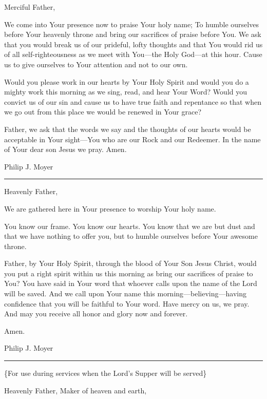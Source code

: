 \documentclass[]{book}
\begin{document}
Merciful Father,

We come into Your presence now to praise Your holy name; To humble
ourselves before Your heavenly throne and bring our sacrifices of praise
before You. We ask that you would break us of our prideful, lofty
thoughts and that You would rid us of all self-righteousness as we meet
with You---the Holy God---at this hour. Cause us to give ourselves to
Your attention and not to our own.

Would you please work in our hearts by Your Holy Spirit and would you do
a mighty work this morning as we sing, read, and hear Your Word? Would
you convict us of our sin and cause us to have true faith and repentance
so that when we go out from this place we would be renewed in Your
grace?

Father, we ask that the words we say and the thoughts of our hearts
would be acceptable in Your sight---You who are our Rock and our
Redeemer. In the name of Your dear son Jesus we pray. Amen.

Philip J. Moyer

\begin{center}\rule{0.5\linewidth}{\linethickness}\end{center}

Heavenly Father,

We are gathered here in Your presence to worship Your holy name.

You know our frame. You know our hearts. You know that we are but dust
and that we have nothing to offer you, but to humble ourselves before
Your awesome throne.

Father, by Your Holy Spirit, through the blood of Your Son Jesus Christ,
would you put a right spirit within us this morning as bring our
sacrifices of praise to You? You have said in Your word that whoever
calls upon the name of the Lord will be saved. And we call upon Your
name this morning---believing---having confidence that you will be
faithful to Your word. Have mercy on us, we pray. And may you receive
all honor and glory now and forever.

Amen.

Philip J. Moyer

\begin{center}\rule{0.5\linewidth}{\linethickness}\end{center}

\{For use during services when the Lord's Supper will be served\}

Heavenly Father, Maker of heaven and earth,
\end{document}
